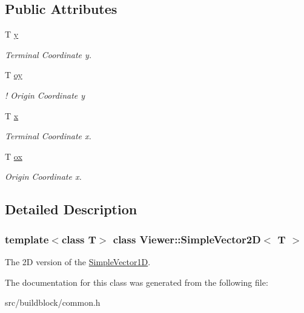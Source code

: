\subsection*{Public Attributes}
\begin{DoxyCompactItemize}
\item 
\mbox{\label{classViewer_1_1SimpleVector2D_af5a6ca0b14de3c4b62c3e2bcf5ed5012}} 
T \mbox{\hyperlink{classViewer_1_1SimpleVector2D_af5a6ca0b14de3c4b62c3e2bcf5ed5012}{y}}
\begin{DoxyCompactList}\small\item\em Terminal Coordinate y. \end{DoxyCompactList}\item 
\mbox{\label{classViewer_1_1SimpleVector2D_a129ba8d14683120474ca46054a9bb5aa}} 
T \mbox{\hyperlink{classViewer_1_1SimpleVector2D_a129ba8d14683120474ca46054a9bb5aa}{oy}}
\begin{DoxyCompactList}\small\item\em ! Origin Coordinate y \end{DoxyCompactList}\item 
\mbox{\label{classViewer_1_1SimpleVector1D_a62759b3724abab5ce8ff8d27a56edff6}} 
T \mbox{\hyperlink{classViewer_1_1SimpleVector1D_a62759b3724abab5ce8ff8d27a56edff6}{x}}
\begin{DoxyCompactList}\small\item\em Terminal Coordinate x. \end{DoxyCompactList}\item 
\mbox{\label{classViewer_1_1SimpleVector1D_ac1aa32ecf8bf68483fa1dd9315fc5dbe}} 
T \mbox{\hyperlink{classViewer_1_1SimpleVector1D_ac1aa32ecf8bf68483fa1dd9315fc5dbe}{ox}}
\begin{DoxyCompactList}\small\item\em Origin Coordinate x. \end{DoxyCompactList}\end{DoxyCompactItemize}


\subsection{Detailed Description}
\subsubsection*{template$<$class T$>$\newline
class Viewer\+::\+Simple\+Vector2\+D$<$ T $>$}

The 2D version of the \mbox{\hyperlink{classViewer_1_1SimpleVector1D}{Simple\+Vector1D}}. 

The documentation for this class was generated from the following file\+:\begin{DoxyCompactItemize}
\item 
src/buildblock/common.\+h\end{DoxyCompactItemize}
